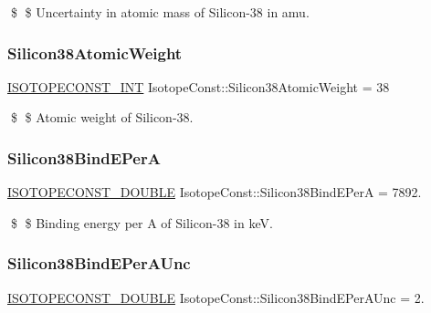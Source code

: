 \$ \$ Uncertainty in atomic mass of Silicon-\/38 in amu. \mbox{\label{group___isotope_const-_silicon-_si38_ga744aa50e20ad5b2b94d9244f6867974f}} 
\subsubsection{\texorpdfstring{Silicon38\+Atomic\+Weight}{Silicon38AtomicWeight}}
{\footnotesize\ttfamily \mbox{\hyperlink{group___isotope_const-_macros_ga5f18360b3e99483a35c32d789e62621c}{I\+S\+O\+T\+O\+P\+E\+C\+O\+N\+S\+T\+\_\+\+I\+NT}} Isotope\+Const\+::\+Silicon38\+Atomic\+Weight = 38}

\$ \$ Atomic weight of Silicon-\/38. \mbox{\label{group___isotope_const-_silicon-_si38_ga7b5aa345679ee81c17a1f7793df5f77f}} 
\subsubsection{\texorpdfstring{Silicon38\+Bind\+E\+PerA}{Silicon38BindEPerA}}
{\footnotesize\ttfamily \mbox{\hyperlink{group___isotope_const-_macros_ga8f45a7272ce02c0b4c65c44636ed719a}{I\+S\+O\+T\+O\+P\+E\+C\+O\+N\+S\+T\+\_\+\+D\+O\+U\+B\+LE}} Isotope\+Const\+::\+Silicon38\+Bind\+E\+PerA = 7892.}

\$ \$ Binding energy per A of Silicon-\/38 in keV. \mbox{\label{group___isotope_const-_silicon-_si38_gab2608ce071ac1145efcbfdf215d1059f}} 
\subsubsection{\texorpdfstring{Silicon38\+Bind\+E\+Per\+A\+Unc}{Silicon38BindEPerAUnc}}
{\footnotesize\ttfamily \mbox{\hyperlink{group___isotope_const-_macros_ga8f45a7272ce02c0b4c65c44636ed719a}{I\+S\+O\+T\+O\+P\+E\+C\+O\+N\+S\+T\+\_\+\+D\+O\+U\+B\+LE}} Isotope\+Const\+::\+Silicon38\+Bind\+E\+Per\+A\+Unc = 2.}

